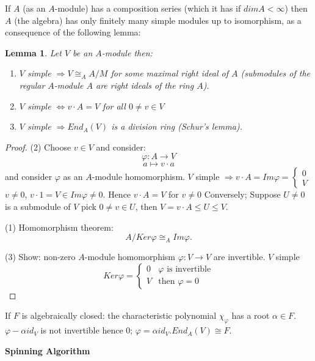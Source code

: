 \documentclass[12pt]{amsart}
\newtheorem{lemma}[theorem]{Lemma}
\theoremstyle{definition}
\begin{document}
If $A$ (as an $A$-module) has a composition series (which it has if $dimA < \infty$) then $A$ (the algebra) has only finitely many simple modules up to isomorphism, as a consequence of the following lemma:
\begin{lemma} \label{schur}
\label{simple}
Let $V$ be an $A$-module then:
\begin{enumerate}
\item $V$ simple $\Rightarrow V \cong_{A} A / M$ for some maximal right ideal of $A$ (submodules of the regular $A$-module $A$ are right ideals of the ring $A$).
\item $V$ simple $\Leftrightarrow v \cdot A = V$ for all $0 \neq v \in V$
\item $V$ simple $\Rightarrow End_{A} (V)$ is a division ring (Schur's lemma).
\end{enumerate}
\end{lemma}

 \begin{proof}
(2) Choose $v \in V$ and consider: $$\varphi: A \rightarrow V$$ $$a \mapsto v \cdot a$$
and consider $\varphi$ as an $A$-module homomorphism. $V$ simple $\Rightarrow v \cdot A = Im \varphi = \begin{cases}
0\\
V
\end{cases}$
$v \neq 0$, $v \cdot 1 = V \in Im \varphi \neq 0$. Hence $v \cdot A = V$ for $v \neq 0$
Conversely; Suppose $U \neq 0$ is a submodule of $V$ pick $0 \neq v \in U$, then $V = v \cdot A \leq U \leq V$.

(1) Homomorphism theorem: $$A / Ker \varphi \cong_{A} Im \varphi.$$

(3) Show: non-zero $A$-module homomorphism $\varphi: V \rightarrow V$ are invertible. $V$ simple $$Ker \varphi = \begin{cases}
0 & \varphi \mbox{ is invertible}\\
V & \mbox{then }\varphi = 0
\end{cases}$$
\end{proof}

If $F$ is algebraically closed: the characteristic polynomial $\chi_{\varphi}$ has a root $\alpha \in F$. $\varphi-\alpha id_{V}$ is not invertible hence 0; $\varphi = \alpha id_{V}. End_{A} (V) \cong F$.

\begin{center}
\textbf{Spinning Algorithm}
\end{center}
\end{document}
